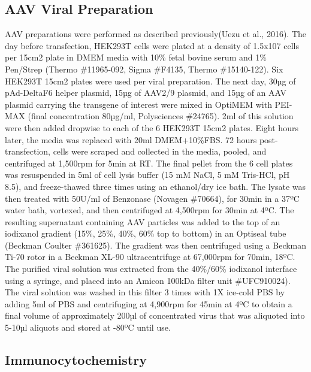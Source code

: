\subsection{AAV Viral Preparation}

AAV preparations were performed as described previously(Uezu et al., 2016). The
day before transfection, HEK293T cells were plated at a density of 1.5x107 cells
per 15cm2 plate in DMEM media with 10\% fetal bovine serum and 1\% Pen/Strep
(Thermo \#11965-092, Sigma \#F4135, Thermo \#15140-122). Six HEK293T 15cm2
plates were used per viral preparation. The next day, 30µg of pAd-DeltaF6 helper
plasmid, 15µg of AAV2/9 plasmid, and 15µg of an AAV plasmid carrying the
transgene of interest were mixed in OptiMEM with PEI-MAX (final concentration
80µg/ml, Polysciences \#24765). 2ml of this solution were then added dropwise to
each of the 6 HEK293T 15cm2 plates. Eight hours later, the media was replaced
with 20ml DMEM+10\%FBS. 72 hours post-transfection, cells were scraped and
collected in the media, pooled, and centrifuged at 1,500rpm for 5min at RT. The
final pellet from the 6 cell plates was resuspended in 5ml of cell lysis buffer
(15 mM NaCl, 5 mM Tris-HCl, pH 8.5), and freeze-thawed three times using an
ethanol/dry ice bath. The lysate was then treated with 50U/ml of Benzonase
(Novagen \#70664), for 30min in a 37ºC water bath, vortexed, and then
centrifuged at 4,500rpm for 30min at 4ºC. The resulting supernatant containing
AAV particles was added to the top of an iodixanol gradient (15\%, 25\%, 40\%,
60\% top to bottom) in an Optiseal tube (Beckman Coulter \#361625). The gradient
was then centrifuged using a Beckman Ti-70 rotor in a Beckman XL-90
ultracentrifuge at 67,000rpm for 70min, 18ºC. The purified viral solution was
extracted from the 40\%/60\% iodixanol interface using a syringe, and placed
into an Amicon 100kDa filter unit \#UFC910024). The viral solution was washed in
this filter 3 times with 1X ice-cold PBS by adding 5ml of PBS and centrifuging
at 4,900rpm for 45min at 4ºC to obtain a final volume of approximately 200µl of
concentrated virus that was aliquoted into 5-10µl aliquots and stored at -80ºC
until use. 

\subsection{Immunocytochemistry}

